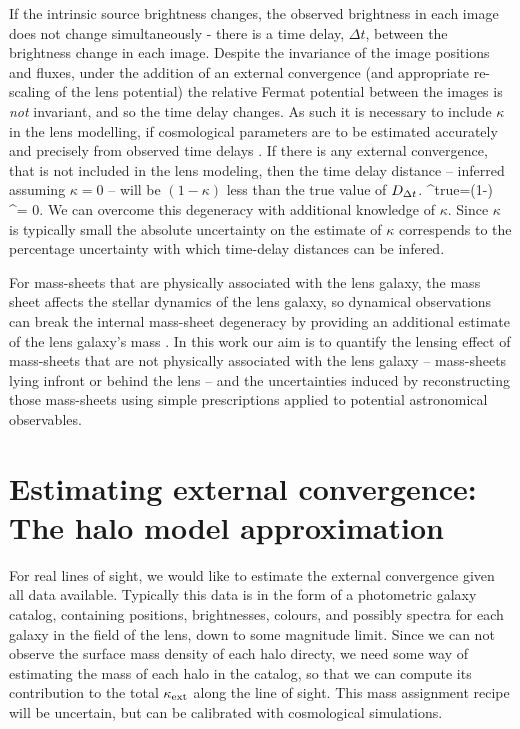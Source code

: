 \documentclass[useAMS,usenatbib]{mn2e}
\begin{document}
If the intrinsic source brightness changes, the observed brightness in each image does not change
simultaneously - there is a time delay, $\Delta t$, between the brightness change in
each image. Despite the invariance of the image positions and fluxes, under the addition
of an external convergence (and appropriate re-scaling of the lens potential) the relative Fermat potential between the images is {\it not}
invariant, and so the time delay changes. As such it is necessary to include $\kappa$
in the lens modelling, if cosmological parameters are to be estimated accurately and
precisely from observed time delays \citep{SuyuEtal2010}. If there is any external convergence, that is not included in the lens
modeling, then the time delay distance -- inferred assuming $\kappa = 0$ -- will be
$(1-\kappa)$ less than the true value of $D_{\Delta t}$.
\be 
\label{eq:MassSheet:Dtbias}
\Dt^{\rm{true}}=(1-\kappa) \Dt^{{\kappax = 0}}.
\ee
We can overcome this degeneracy with additional knowledge of $\kappa$.
Since $\kappa$ is typically small the absolute uncertainty on the estimate
of $\kappa$ correspends to the percentage uncertainty with which time-delay
distances can be infered.

For mass-sheets that are physically associated with the lens galaxy, the mass sheet
 affects the stellar dynamics of the
lens galaxy, so dynamical observations can break the internal
mass-sheet degeneracy by providing an additional estimate of the lens galaxy's mass
\citep[e.g.,][]{SuyuEtal2010}. In this work our aim is to quantify the lensing effect of mass-sheets that are not physically associated with the lens galaxy -- mass-sheets
lying infront or behind the lens -- and the uncertainties induced by reconstructing
those mass-sheets using simple prescriptions applied to potential astronomical observables.




\section{Estimating external convergence: The halo model approximation}
\label{sec:model}

For real lines of sight, we would like to estimate the external convergence given all
data available. Typically this data is in the form of a photometric galaxy
catalog, containing positions, brightnesses, colours, and possibly spectra for each galaxy in the
field of the lens, down to some magnitude
limit. Since we can not observe the surface mass density of each halo
directy, we need some way of estimating
the mass of each halo in the catalog, so that we can compute its
contribution to the total $\kappa_{\rm ext}$ along the line of sight. This mass assignment recipe will be uncertain, but
can be calibrated with cosmological simulations.
\end{document}
